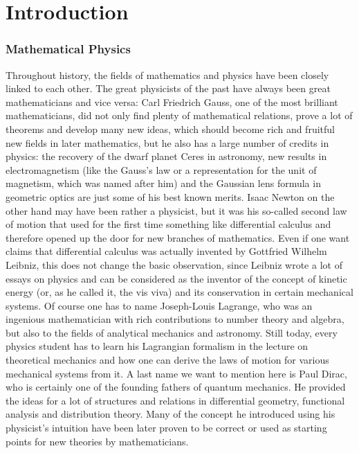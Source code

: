 
%
%

\chapter{Introduction}
\label{sec:Intro}

\subsection*{Mathematical Physics}
Throughout history, the fields of mathematics and physics have been 
closely linked to each other. The great physicists of the past have always been 
great mathematicians and vice versa: Carl Friedrich Gauss, one of the
most brilliant mathematicians, did not only find plenty of mathematical 
relations, prove a lot of theorems and develop many new ideas, which 
should become rich and fruitful new fields in later mathematics, but he also has a 
large number of credits in physics: the recovery of the dwarf planet Ceres in 
astronomy, new results in electromagnetism (like the Gauss's law or a 
representation for the unit of magnetism, which was named after him) and the 
Gaussian lens formula in geometric optics are just some of his best known 
merits. Isaac Newton on the other hand may have been rather a physicist, but 
it was his so-called second law of motion that used for the first time 
something like differential calculus and therefore opened up the door for new 
branches of mathematics. Even if one want claims that differential calculus 
was actually invented by Gottfried Wilhelm Leibniz, this does not change 
the basic observation, since Leibniz wrote a lot of essays on physics and can 
be considered as the inventor of the concept of kinetic energy (or, as he 
called it, the vis viva) and its conservation in certain mechanical 
systems. Of course one has to name Joseph-Louis Lagrange, who was an ingenious 
mathematician with rich contributions to number theory and algebra, but also to 
the fields of analytical mechanics and astronomy. Still today, every physics 
student has to learn his Lagrangian formalism in the lecture on theoretical 
mechanics and how one can derive the laws of motion for various mechanical 
systems from it. A last name we want to mention here is Paul 
Dirac, who is certainly one of the founding fathers of quantum mechanics. He 
provided the ideas for a lot of structures and relations in differential 
geometry, functional analysis and distribution theory. Many of the concept he 
introduced using his physicist's intuition have been later proven to be correct or 
used as starting points for new theories by mathematicians.


